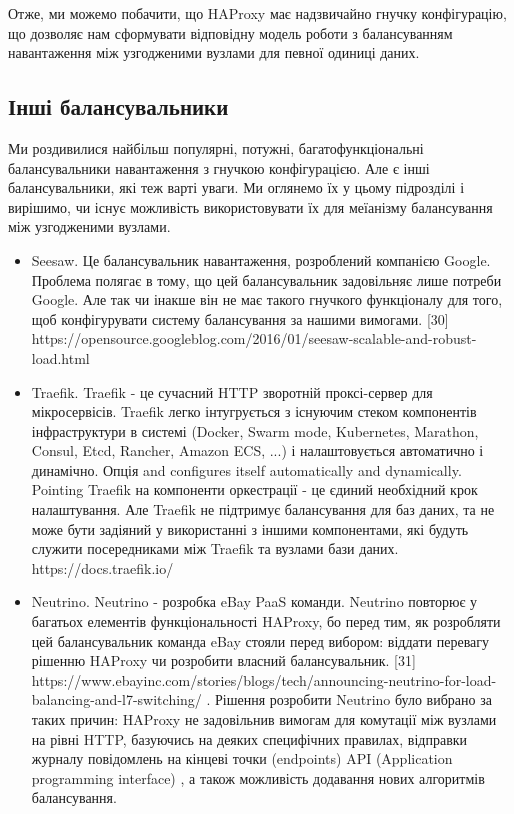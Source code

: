 \documentclass[14pt]{vakthesis}
\begin{document}
Отже, ми можемо побачити, що HAProxy має надзвичайно гнучку конфігурацію, що дозволяє нам сформувати відповідну модель роботи з балансуванням навантаження між узгодженими вузлами для певної одиниці даних.

\subsection{Інші балансувальники}

Ми роздивилися найбільш популярні, потужні, багатофункціональні балансувальники навантаження  з гнучкою конфігурацією. Але є інші балансувальники, які теж варті уваги. Ми оглянемо їх у цьому підрозділі і вирішимо, чи існує можливість використовувати їх для меїанізму балансування між узгодженими вузлами.
\begin{itemize}

\item Seesaw. Це балансувальник навантаження, розроблений компанією Google. Проблема полягає в тому, що цей балансувальник задовільняє лише потреби Google. Але так чи інакше він не має такого гнучкого функціоналу для того, щоб конфігурувати систему балансування за нашими вимогами. [30]
https://opensource.googleblog.com/2016/01/seesaw-scalable-and-robust-load.html

\item Traefik. Traefik - це сучасний HTTP зворотній проксі-сервер для мікросервісів. Traefik легко інтугрується з існуючим стеком компонентів інфраструктури в системі (Docker, Swarm mode, Kubernetes, Marathon, Consul, Etcd, Rancher, Amazon ECS, ...) і налаштовується автоматично і динамічно. Опція 
and configures itself automatically and dynamically. Pointing Traefik на компоненти оркестрації - це єдиний необхідний крок налаштування. Але Traefik не підтримує балансування для баз даних, та не може бути задіяний у використанні з іншими компонентами, які будуть служити посередниками між Traefik та вузлами бази даних.
https://docs.traefik.io/

\item Neutrino. Neutrino - розробка eBay PaaS команди. Neutrino повторює у багатьох елементів функціональності HAProxy, бо перед тим, як розробляти цей балансувальник команда eBay стояли перед вибором: віддати перевагу рішенню HAProxy чи розробити власний балансувальник.  [31]
https://www.ebayinc.com/stories/blogs/tech/announcing-neutrino-for-load-balancing-and-l7-switching/ . Рішення розробити Neutrino було вибрано за таких причин:
HAProxy не задовільнив вимогам для комутації між вузлами на рівні HTTP, базуючись на деяких специфічних правилах, 
відправки журналу повідомлень на кінцеві точки (endpoints) API (Application programming interface) , а також можливість додавання нових алгоритмів балансування.


\end{itemize}
\end{document}
